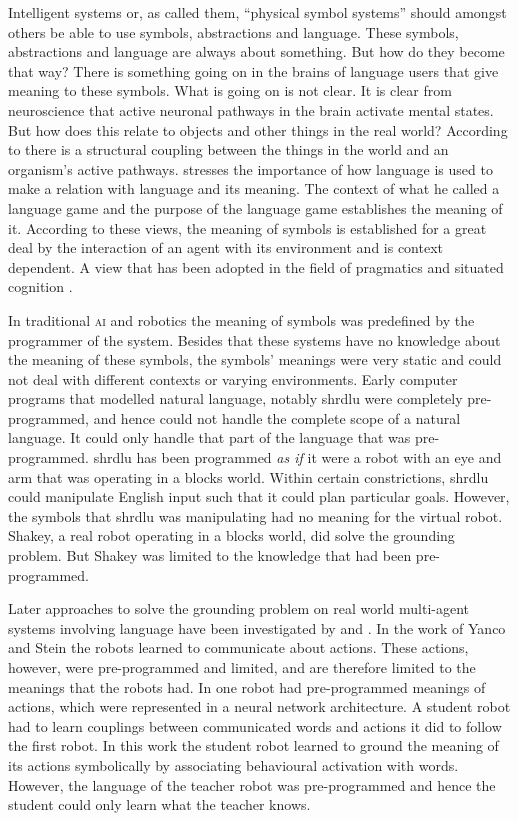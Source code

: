 Intelligent systems or, as \citet{newell:1980} called them, ``physical symbol systems'' should amongst others be able to use symbols, abstractions and language. These symbols, abstractions and language are always about something. But how do they become that way? There is something going on in the brains of language users that give meaning to these symbols. What is going on is not clear. It is clear from neuroscience that active neuronal pathways in the brain activate mental states. But how does this relate to objects and other things in the real world? According to \citet{maturanavarela:1992} there is a structural coupling between the things in the world and an organism's active pathways. \citet{wittgenstein:1958} stresses the importance of how language is used to make a relation with language and its meaning. The context of what he called a language game and the purpose of the language game establishes the meaning of it. According to these views, the meaning of symbols is established for a great deal by the interaction of an agent with its environment and is context dependent. A view that has been adopted in the field of pragmatics and situated cognition \citep{clancey:1997}.

In traditional {\scshape ai} and robotics the meaning of symbols was predefined by the programmer of the system. Besides that these systems have no knowledge about the meaning of these symbols, the symbols' meanings were very static and could not deal with different contexts or varying environments. Early computer programs that modelled natural language, notably {\sc shrdlu} \citep{winograd:1972} were completely pre-programmed, and hence could not handle the complete scope of a natural language. It could only handle that part of the language that was pre-programmed. {\sc shrdlu} has been programmed {\em as if} it were a robot with an eye and arm that was operating in a blocks world. Within certain constrictions, {\sc shrdlu} could manipulate English input such that it could plan particular goals. However, the symbols that {\sc shrdlu} was manipulating had no meaning for the virtual robot. Shakey, a real robot operating in a blocks world, did solve the grounding problem. But Shakey was limited to the knowledge that had been pre-programmed.

Later approaches to solve the grounding problem on real world multi-agent systems involving language have been investigated by \citet{yancostein} and \citet{billard:1997a}. In the work of Yanco and Stein the robots learned to communicate about actions. These actions, however, were pre-programmed and limited, and are therefore limited to the meanings that the robots had. In \citet{billard:1997a} one robot had pre-programmed meanings of actions, which were represented in a neural network architecture. A student robot had to learn couplings between communicated words and actions it did to follow the first robot. In this work the student robot learned to ground the meaning of its actions symbolically by associating behavioural activation with words. However, the language of the teacher robot was pre-programmed and hence the student could only learn what the teacher knows.

